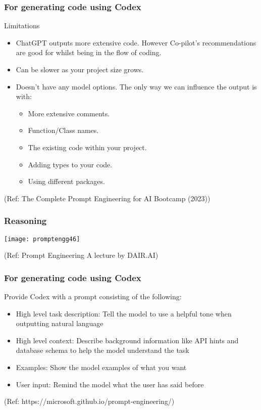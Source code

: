 \begin{frame}[fragile]\frametitle{For generating code using Codex}

Limitations


\begin{itemize}
\item  ChatGPT outputs more extensive code. However Co-pilot’s recommendations are good for whilst being in the flow of
coding.
\item Can be slower as your project size grows.
\item Doesn’t have any model options. The only way we can influence the output is with:
	\begin{itemize}
	\item More extensive comments.
	\item Function/Class names.
	\item The existing code within your project.
	\item Adding types to your code.
	\item Using different packages.
	\end{itemize}	 
\end{itemize}	 

{\tiny (Ref: The Complete Prompt Engineering for AI Bootcamp (2023))}

\end{frame}

\begin{frame}[fragile]\frametitle{Reasoning}

\begin{center}
\texttt{[image: promptengg46]}

{\tiny (Ref: Prompt Engineering A lecture by DAIR.AI)}

\end{center}
\end{frame}




\begin{frame}[fragile]\frametitle{For generating code using Codex}

Provide Codex with a prompt consisting of the following:



\begin{itemize}
\item  High level task description: Tell the model to use a helpful tone when outputting natural language
\item  High level context: Describe background information like API hints and database schema to help the model understand the task
\item  Examples: Show the model examples of what you want
\item  User input: Remind the model what the user has said before
\end{itemize}	 

{\tiny (Ref: https://microsoft.github.io/prompt-engineering/)}

\end{frame}

